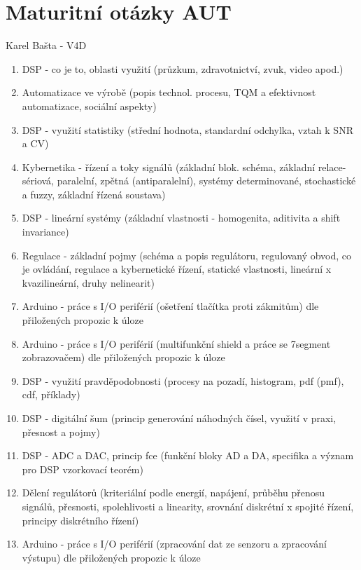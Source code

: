 \documentclass[a4paper,11pt]{article}
\begin{document}

\section*{Maturitní otázky AUT}
\begin{center}
    \Large Karel Bašta - V4D
\end{center}

\begin{enumerate}
    \item DSP - co je to, oblasti využití (průzkum, zdravotnictví, zvuk, video apod.)
    \item Automatizace ve výrobě (popis technol. procesu, TQM a efektivnost automatizace, sociální aspekty)
    \item DSP - využití statistiky (střední hodnota, standardní odchylka, vztah k SNR a CV)
    \item Kybernetika - řízení a toky signálů (základní blok. schéma, základní relace- sériová, paralelní, zpětná (antiparalelní), systémy determinované, stochastické a fuzzy, základní řízená soustava)
    \item DSP - lineární systémy (základní vlastnosti - homogenita, aditivita a shift invariance)
    \item Regulace - základní pojmy (schéma a popis regulátoru, regulovaný obvod, co je ovládání, regulace a kybernetické řízení, statické vlastnosti, lineární x kvazilineární, druhy nelinearit)
    \item Arduino - práce s I/O periférií (ošetření tlačítka proti zákmitům) dle přiložených propozic k úloze
    \item Arduino - práce s I/O periférií (multifunkční shield a práce se 7segment zobrazovačem) dle přiložených propozic k úloze
    \item DSP - využití pravděpodobnosti (procesy na pozadí, histogram, pdf (pmf), cdf, příklady)
    \item DSP - digitální šum (princip generování náhodných čísel, využití v praxi, přesnost a pojmy)
    \item DSP - ADC a DAC, princip fce (funkční bloky AD a DA, specifika a význam pro DSP vzorkovací teorém)
    \item Dělení regulátorů (kriteriální podle energií, napájení, průběhu přenosu signálů, přesnosti, spolehlivosti a linearity, srovnání diskrétní x spojité řízení, principy diskrétního řízení)
    \item Arduino - práce s I/O periférií (zpracování dat ze senzoru a zpracování výstupu) dle přiložených propozic k úloze

\end{enumerate}
\end{document}

